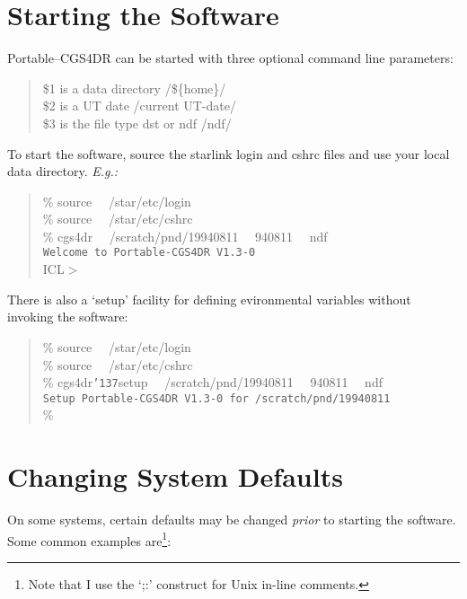 \documentclass[a4paper]{book}
\renewcommand{\_}{{\tt\char'137}}
\begin{document}
\section{Starting the Software}
Portable--CGS4DR can be started with three optional command line parameters:

\begin{minipage}{120mm}
\begin{quote}
  \$1 is a data directory \hfill /\$\{home\}/ \\
  \$2 is a UT date \hfill /current UT-date/ \\
  \$3 is the file type {\sc dst} or {\sc ndf} \hfill /ndf/
\end{quote}
\end{minipage}

To start the software, source the {\sc starlink} login and cshrc files
and use your local data directory. {\em E.g.:}

\begin{minipage}{120mm}
\begin{quote}
  \%  source \ \ /star/etc/login \\
  \%  source \ \ /star/etc/cshrc \\
  \%  cgs4dr \ \ /scratch/pnd/19940811 \ \ 940811 \ \ ndf \\[4ex]
      {\tt Welcome to Portable-CGS4DR V1.3-0} \\[2ex]
  ICL$>$
\end{quote}
\end{minipage}

There is also a `setup' facility for defining evironmental variables without
invoking the software:

\begin{minipage}{120mm}
\begin{quote}
  \%  source \ \ /star/etc/login \\
  \%  source \ \ /star/etc/cshrc \\
  \%  cgs4dr\_setup \ \ /scratch/pnd/19940811 \ \ 940811 \ \ ndf \\[4ex]
      {\tt Setup Portable-CGS4DR V1.3-0 for /scratch/pnd/19940811} \\[2ex]
  \%
\end{quote}
\end{minipage}

\section{Changing System Defaults}
On some systems, certain defaults may be changed {\em prior} to
starting the software. Some common examples are\footnote[2]{Note that I 
use the `;:' construct for Unix in-line comments.}:
\end{document}
